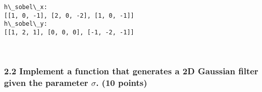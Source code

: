\documentclass[11pt]{article}
\begin{document}
    \begin{Verbatim}[commandchars=\\\{\}]
h\_sobel\_x:
[[1, 0, -1], [2, 0, -2], [1, 0, -1]]
h\_sobel\_y:
[[1, 2, 1], [0, 0, 0], [-1, -2, -1]]

    \end{Verbatim}

    \begin{center}
    \end{center}
    { \hspace*{\fill} \\}
    
    \subsubsection{\texorpdfstring{2.2 Implement a function that generates a
2D Gaussian filter given the parameter \(\sigma\). (10
points)}{2.2 Implement a function that generates a 2D Gaussian filter given the parameter \textbackslash{}sigma. (10 points)}}\label{implement-a-function-that-generates-a-2d-gaussian-filter-given-the-parameter-sigma.-10-points}
\end{document}
